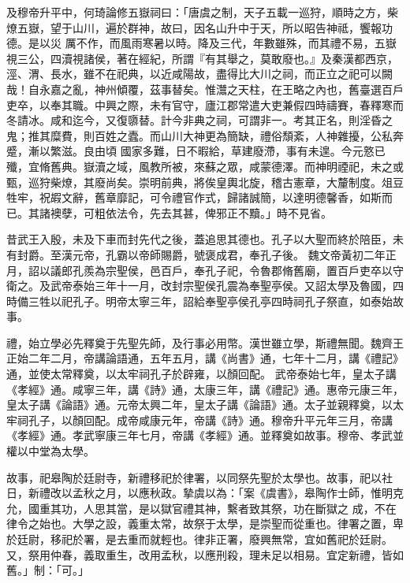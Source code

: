 \begin{pinyinscope}
 及穆帝升平中，何琦論修五嶽祠曰：「唐虞之制，天子五載一巡狩，順時之方，柴燎五嶽，望于山川，遍於群神，故曰，因名山升中于天，所以昭告神祗，饗報功德。是以災
 厲不作，而風雨寒暑以時。降及三代，年數雖殊，而其禮不易，五嶽視三公，四瀆視諸侯，著在經紀，所謂『有其舉之，莫敢廢也。』及秦漢都西京，涇、渭、長水，雖不在祀典，以近咸陽故，盡得比大川之祠，而正立之祀可以闕哉！自永嘉之亂，神州傾覆，茲事替矣。惟灊之天柱，在王略之內也，舊臺選百戶吏卒，以奉其職。中興之際，未有官守，廬江郡常遣大吏兼假四時禱賽，春釋寒而冬請冰。咸和迄今，又復隳替。計今非典之祠，可謂非一。考其正名，則淫昏之鬼；推其糜費，則百姓之蠹。而山川大神更為簡缺，禮俗頹紊，人神雜擾，公私奔蹙，漸以繁滋。良由頃
 國家多難，日不暇給，草建廢滯，事有未遑。今元憝已殲，宜脩舊典。嶽瀆之域，風教所被，來蘇之眾，咸蒙德澤。而神明禋祀，未之或甄，巡狩柴燎，其廢尚矣。崇明前典，將俟皇輿北旋，稽古憲章，大釐制度。俎豆牲牢，祝嘏文辭，舊章靡記，可令禮官作式，歸諸誠簡，以達明德馨香，如斯而已。其諸襖孽，可粗依法令，先去其甚，俾邪正不黷。」時不見省。



 昔武王入殷，未及下車而封先代之後，蓋追思其德也。孔子以大聖而終於陪臣，未有封爵。至漢元帝，孔霸以帝師賜爵，號褒成君，奉孔子後。
 魏文帝黃初二年正月，詔以議郎孔羨為宗聖侯，邑百戶，奉孔子祀，令魯郡脩舊廟，置百戶吏卒以守衛之。及武帝泰始三年十一月，改封宗聖侯孔震為奉聖亭侯。又詔太學及魯國，四時備三牲以祀孔子。明帝太寧三年，詔給奉聖亭侯孔亭四時祠孔子祭直，如泰始故事。



 禮，始立學必先釋奠于先聖先師，及行事必用幣。漢世雖立學，斯禮無聞。魏齊王正始二年二月，帝講論語通，五年五月，講《尚書》通，七年十二月，講《禮記》通，並使太常釋奠，以太牢祠孔子於辟雍，以顏回配。
 武帝泰始七年，皇太子講《孝經》通。咸寧三年，講《詩》通，太康三年，講《禮記》通。惠帝元康三年，皇太子講《論語》通。元帝太興二年，皇太子講《論語》通。太子並親釋奠，以太牢祠孔子，以顏回配。成帝咸康元年，帝講《詩》通。穆帝升平元年三月，帝講《孝經》通。孝武寧康三年七月，帝講《孝經》通。並釋奠如故事。穆帝、孝武並權以中堂為太學。



 故事，祀皋陶於廷尉寺，新禮移祀於律署，以同祭先聖於太學也。故事，祀以社日，新禮改以孟秋之月，以應秋政。摯虞以為：「案《虞書》，皋陶作士師，惟明克允，國重其功，人思其當，是以獄官禮其神，繫者致其祭，功在斷獄之
 成，不在律令之始也。大學之設，義重太常，故祭于太學，是崇聖而從重也。律署之置，卑於廷尉，移祀於署，是去重而就輕也。律非正署，廢興無常，宜如舊祀於廷尉。又，祭用仲春，義取重生，改用孟秋，以應刑殺，理未足以相易。宜定新禮，皆如舊。」制：「可。」




\end{pinyinscope}
